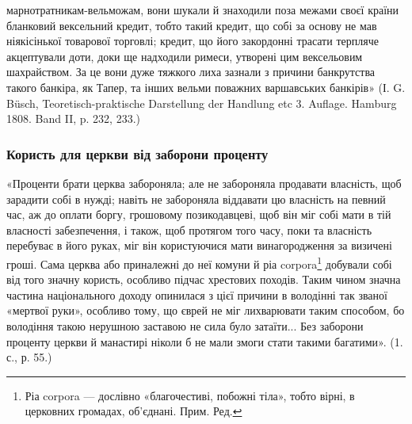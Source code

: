 \parcont{}  %
марнотратникам-вельможам, вони шукали й знаходили поза межами своєї країни
бланковий вексельний кредит, тобто такий кредит, що собі за основу не мав
ніякісінької товарової торговлі; кредит, що його закордонні трасати терпляче
акцептували доти, доки ще надходили римеси, утворені цим вексельовим шахрайством.
За це вони дуже тяжкого лиха зазнали з причини банкрутства такого
банкіра, як Тапер, та інших вельми поважних варшавських банкірів» (І. G. Büsch,
Teoretisch-praktische Darstellung der Handlung etc 3. Auflage. Hamburg 1808. Band
II, p. 232, 233.)

\subsubsection{Користь для церкви від заборони проценту}

«Проценти брати церква забороняла; але не забороняла продавати власність,
щоб зарадити собі в нужді; навіть не забороняла віддавати цю власність
на певний час, аж до оплати боргу, грошовому позикодавцеві, щоб він міг собі
мати в тій власності забезпечення, і також, щоб протягом того часу, поки та
власність перебуває в його руках, міг він користуючися мати винагородження
за визичені гроші. Сама церква або приналежні до неї комуни й ріа corpora\footnote*{
Ріа corpora — дослівно «благочестиві, побожні тіла», тобто вірні, в церковних громадах,
об’єднані. Прим. Ред.
} добували
собі від того значну користь, особливо підчас хрестових походів. Таким
чином значна частина національного доходу опинилася з цієї причини в володінні
так званої «мертвої руки», особливо тому, що єврей не міг лихварювати таким
способом, бо володіння такою нерушною заставою не сила було затаїти... Без
заборони проценту церкви й манастирі ніколи б не мали змоги стати такими
багатими». (1. с., р. 55.)


